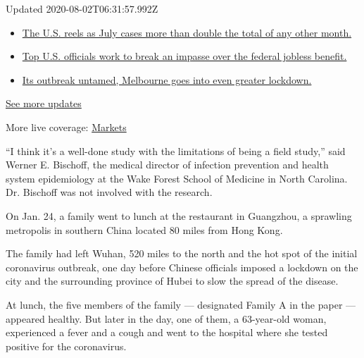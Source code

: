Updated 2020-08-02T06:31:57.992Z

\begin{itemize}
\tightlist
\item
  \href{https://www.nytimes.com/2020/08/01/world/coronavirus-covid-19.html?action=click\&pgtype=Article\&state=default\&region=MAIN_CONTENT_1\&context=storylines_live_updates\#link-34047410}{The
  U.S. reels as July cases more than double the total of any other
  month.}
\item
  \href{https://www.nytimes.com/2020/08/01/world/coronavirus-covid-19.html?action=click\&pgtype=Article\&state=default\&region=MAIN_CONTENT_1\&context=storylines_live_updates\#link-780ec966}{Top
  U.S. officials work to break an impasse over the federal jobless
  benefit.}
\item
  \href{https://www.nytimes.com/2020/08/01/world/coronavirus-covid-19.html?action=click\&pgtype=Article\&state=default\&region=MAIN_CONTENT_1\&context=storylines_live_updates\#link-2bc8948}{Its
  outbreak untamed, Melbourne goes into even greater lockdown.}
\end{itemize}

\href{https://www.nytimes.com/2020/08/01/world/coronavirus-covid-19.html?action=click\&pgtype=Article\&state=default\&region=MAIN_CONTENT_1\&context=storylines_live_updates}{See
more updates}

More live coverage:
\href{https://www.nytimes.com/live/2020/07/31/business/stock-market-today-coronavirus?action=click\&pgtype=Article\&state=default\&region=MAIN_CONTENT_1\&context=storylines_live_updates}{Markets}

``I think it's a well-done study with the limitations of being a field
study,'' said Werner E. Bischoff, the medical director of infection
prevention and health system epidemiology at the Wake Forest School of
Medicine in North Carolina. Dr. Bischoff was not involved with the
research.

On Jan. 24, a family went to lunch at the restaurant in Guangzhou, a
sprawling metropolis in southern China located 80 miles from Hong Kong.

The family had left Wuhan, 520 miles to the north and the hot spot of
the initial coronavirus outbreak, one day before Chinese officials
imposed a lockdown on the city and the surrounding province of Hubei to
slow the spread of the disease.

At lunch, the five members of the family --- designated Family A in the
paper --- appeared healthy. But later in the day, one of them, a
63-year-old woman, experienced a fever and a cough and went to the
hospital where she tested positive for the coronavirus.

